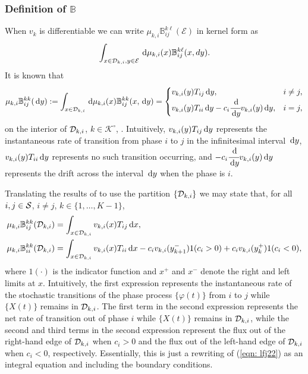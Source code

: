 \subsubsection{Definition of \(\mathbb B\)}
When \(v_k\) is differentiable we can write \(\mu_{k,i}\mathbb B_{ij}^{k\ell}(\mathcal{E})\) in kernel form as \[\displaystyle\int_{x\in\mathcal{D}_{k,i},y\in\mathcal{E}}\, \mathrm{d} \mu_{k,i}(x)\mathbb B_{ij}^{k\ell}(x,dy).\] It is known that
\begin{align}\label{eqn: lfj22}\mu_{k,i}\mathbb B_{ij}^{kk}(\, \mathrm{d} y):=\int_{x\in\mathcal{D}_{k,i}}\, \mathrm{d}\mu_{k,i}(x)\mathbb B_{ij}^{kk}(x,\, \mathrm{d} y)=\begin{cases}
v_{k,i}(y)T_{ij}\, \mathrm{d} y, & i\neq j,\\
v_{k,i}(y)T_{ii}\, \mathrm{d} y - c_i\cfrac{\, \mathrm{d}}{\, \mathrm{d} y}v_{k,i}(y)\, \mathrm{d} y, & i=j, 
\end{cases}\end{align}
on the interior of \(\mathcal{D}_{k,i}\), \(k\in\mathcal K^\circ\), \citep{kk1995}. Intuitively, \(v_{k,i}(y)T_{ij}\, \mathrm{d} y\) represents the instantaneous rate of transition from phase \(i\) to \(j\) in the infinitesimal interval \(\, \mathrm{d} y\), \(v_{k,i}(y)T_{ii}\, \mathrm{d} y\) represents no such transition occurring, and \(- c_i\cfrac{\, \mathrm{d}}{\, \mathrm{d} y}v_{k,i}(y)\, \mathrm{d} y\) represents the drift across the interval \(\, \mathrm{d} y\) when the phase is \(i\). 

Translating the results of \cite{bo2014} to use the partition \(\{\mathcal{D}_{k,i}\}\) we may state that, for all \(i,j\in\mathcal{S}\), \(i\neq j\), \(k\in\{1,\dots,K-1\}\),
\begin{align*}
	\mu_{k,i}\mathbb B_{ij}^{kk}(\mathcal{D}_{k,i})&=\int_{x\in\mathcal{D}_{k,i}}v_{k,i}(x)T_{ij}\, \mathrm{d} x,\\
	\mu_{k,i}\mathbb B_{ii}^{kk}(\mathcal{D}_{k,i})&=\int_{x\in\mathcal{D}_{k,i}}v_{k,i}(x)T_{ii}\, \mathrm{d} x - c_iv_{k,i}(y_{k+1}^-) 1{(c_i>0)} + c_iv_{k,i}(y_{k}^+) 1{(c_i<0)},
\end{align*}
where \( 1(\cdot)\) is the indicator function and \(x^+\) and \(x^-\) denote the right and left limits at \(x\). 
Intuitively, the first expression represents the instantaneous rate of the stochastic transitions of the phase process \(\{\varphi(t)\}\) from \(i\) to \(j\) while \(\{X(t)\}\) remains in \(\mathcal{D}_{k,i}\). The first term in the second expression represents the net rate of transition out of phase \(i\) while \(\{X(t)\}\) remains in \(\mathcal{D}_{k,i}\), while the second and third terms in the second expression represent the flux out of the right-hand edge of \(\mathcal{D}_{k,i}\) when \(c_i>0\) and the flux out of the left-hand edge of \(\mathcal{D}_{k,i}\) when \(c_i<0\), respectively. Essentially, this is just a rewriting of (\ref{eqn: lfj22}) as an integral equation and including the boundary conditions.

